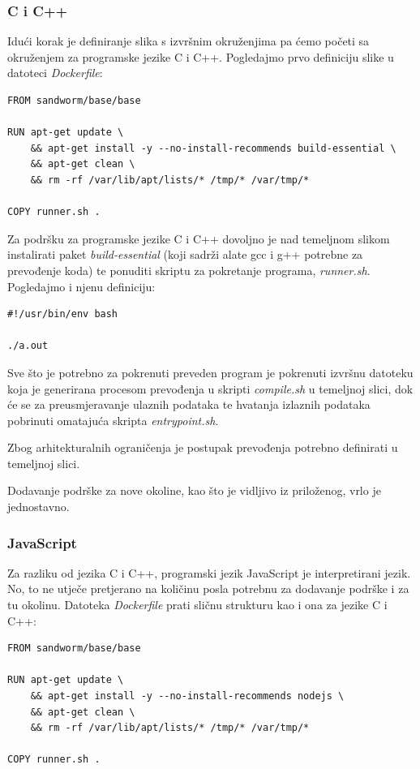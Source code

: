\documentclass[times, utf8, zavrsni]{fer}
\begin{document}
\subsubsection{C i C++}

Idući korak je definiranje slika s izvršnim okruženjima pa ćemo početi sa okruženjem za programske jezike C i C++. Pogledajmo prvo definiciju slike u datoteci {\textit{Dockerfile}}:

\begin{lstlisting}
FROM sandworm/base/base

RUN apt-get update \
    && apt-get install -y --no-install-recommends build-essential \
    && apt-get clean \
    && rm -rf /var/lib/apt/lists/* /tmp/* /var/tmp/*

COPY runner.sh .
\end{lstlisting}

Za podršku za programske jezike C i C++ dovoljno je nad temeljnom slikom instalirati paket {\textit{build-essential}} (koji sadrži alate gcc i g++ potrebne za prevođenje koda) te ponuditi skriptu za pokretanje programa, {\textit{runner.sh}}. Pogledajmo i njenu definiciju:

\begin{lstlisting}
#!/usr/bin/env bash

./a.out
\end{lstlisting}

Sve što je potrebno za pokrenuti preveden program je pokrenuti izvršnu datoteku koja je generirana procesom prevođenja u skripti {\textit{compile.sh}} u temeljnoj slici, dok će se za preusmjeravanje ulaznih podataka te hvatanja izlaznih podataka pobrinuti omatajuća skripta {\textit{entrypoint.sh}}.

Zbog arhitekturalnih ograničenja je postupak prevođenja potrebno definirati u temeljnoj slici. 

Dodavanje podrške za nove okoline, kao što je vidljivo iz priloženog, vrlo je jednostavno.

\subsubsection{JavaScript}

Za razliku od jezika C i C++, programski jezik JavaScript je interpretirani jezik. No, to ne utječe pretjerano na količinu posla potrebnu za dodavanje podrške i za tu okolinu. Datoteka {\textit{Dockerfile}} prati sličnu strukturu kao i ona za jezike C i C++:

\begin{lstlisting}
FROM sandworm/base/base

RUN apt-get update \
    && apt-get install -y --no-install-recommends nodejs \
    && apt-get clean \
    && rm -rf /var/lib/apt/lists/* /tmp/* /var/tmp/*

COPY runner.sh .
\end{lstlisting}
\end{document}
